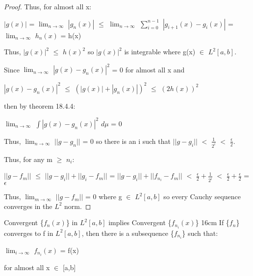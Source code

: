 \begin{proof}
        Thus, for almost all x:

        \hspace{0.5cm}
        $|g(x)|$
        = $\lim_{n \rightarrow \infty}$ $|g_n(x)|$
        $\leq$ $\lim_{n \rightarrow \infty}$
            $\sum_{i=0}^{n-1}$ $|g_{i+1}(x) - g_i(x)|$
        = $\lim_{n \rightarrow \infty}$ $h_n(x)$
        = h(x)

        Thus, $|g(x)|^2$ $\leq$ $h(x)^2$
        so $|g(x)|^2$ is integrable where g(x) $\in$ $L^2[a,b]$.

        Since $\lim_{n \rightarrow \infty}$ $|g(x) - g_n(x)|^2$ = 0
        for almost all x and

        \hspace{0.5cm}
        $|g(x) - g_n(x)|^2$
        $\leq$ $(|g(x)| + |g_n(x)|)^2$
        $\leq$ $(2h(x))^2$
        
        then by {\color{red} theorem 18.4.4}:

        \hspace{0.5cm}
        $\lim_{n \rightarrow \infty}$ $\int |g(x) - g_n(x)|^2$ $d\mu$ = 0

        Thus, $\lim_{n \rightarrow \infty}$ $||g-g_n||$ = 0
        so there is an i such that $||g-g_i||$ $<$ $\frac{1}{2^i}$
        $<$ $\frac{\epsilon}{2}$.

        Thus, for any m $\geq$ $n_i$:

        \hspace{0.5cm}
        $||g - f_m||$
        $\leq$ $||g - g_i|| + ||g_i - f_m||$
        = $||g - g_i|| + ||f_{n_i} - f_m||$
        $<$ $\frac{\epsilon}{2} + \frac{1}{2^i}$
        $<$ $\frac{\epsilon}{2} + \frac{\epsilon}{2}$
        = $\epsilon$

        Thus, $\lim_{m \rightarrow \infty}$ $||g - f_m||$ = 0
        where g $\in$ $L^2[a,b]$
        so every Cauchy sequence converges in the $L^2$ norm.
    \end{proof}

    \vspace{0.5cm}



    \begin{corollary}{Convergent \{$f_n(x)$\} in $L^2[a,b]$
    implies Convergent \{$f_{n_i}(x)$\} }{16cm}
        If \{$f_n$\} converges to f in $L^2[a,b]$, then
        there is a subsequence \{$f_{n_i}$\} such that:

        \hspace{0.5cm}
        $\lim_{i \rightarrow \infty}$ $f_{n_i}(x)$ = f(x)

        for almost all x $\in$ [a,b]
    \end{corollary}

